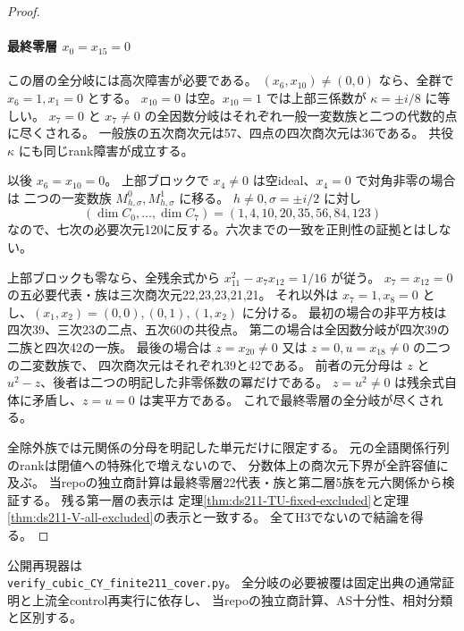 \begin{proof}
\paragraph{最終零層 $x_0=x_{15}=0$}
この層の全分岐には高次障害が必要である。
$(x_6,x_{10})\ne(0,0)$ なら、全群で $x_6=1,x_1=0$ とする。
$x_{10}=0$ は空。$x_{10}=1$ では上部三係数が $\kappa=\pm i/8$ に等しい。
$x_7=0$ と $x_7\ne0$ の全因数分岐はそれぞれ一般一変数族と二つの代数的点に尽くされる。
一般族の五次商次元は57、四点の四次商次元は36である。
共役 $\kappa$ にも同じrank障害が成立する。

以後 $x_6=x_{10}=0$。
上部ブロックで $x_4\ne0$ は空ideal、$x_4=0$ で対角非零の場合は
二つの一変数族 $M^0_{h,\sigma},M^1_{h,\sigma}$ に移る。
$h\ne0,\sigma=\pm i/2$ に対し
\[
 (\dim C_0,\ldots,\dim C_7)=(1,4,10,20,35,56,84,123)
\]
なので、七次の必要次元120に反する。六次までの一致を正則性の証拠とはしない。

上部ブロックも零なら、全残余式から
$x_{11}^2-x_7x_{12}=1/16$ が従う。
$x_7=x_{12}=0$ の五必要代表・族は三次商次元22,23,23,21,21。
それ以外は $x_7=1,x_8=0$ とし、$(x_1,x_2)=(0,0),(0,1),(1,x_2)$ に分ける。
最初の場合の非平方枝は四次39、三次23の二点、五次60の共役点。
第二の場合は全因数分岐が四次39の二族と四次42の一族。
最後の場合は $z=x_{20}\ne0$ 又は $z=0,u=x_{18}\ne0$ の二つの二変数族で、
四次商次元はそれぞれ39と42である。
前者の元分母は $z$ と $u^2-z$、後者は二つの明記した非零係数の冪だけである。
$z=u^2\ne0$ は残余式自体に矛盾し、$z=u=0$ は実平方である。
これで最終零層の全分岐が尽くされる。

全除外族では元関係の分母を明記した単元だけに限定する。
元の全語関係行列のrankは閉値への特殊化で増えないので、
分数体上の商次元下界が全許容値に及ぶ。
当repoの独立商計算は最終零層22代表・族と第二層5族を元六関係から検証する。
残る第一層の表示は
定理\ref{thm:ds211-TU-fixed-excluded}と定理\ref{thm:ds211-V-all-excluded}の表示と一致する。
全てH3でないので結論を得る。
\end{proof}

公開再現器は\\
\texttt{verify\_cubic\_CY\_finite211\_cover.py}。
全分岐の必要被覆は固定出典の通常証明と上流全control再実行に依存し、
当repoの独立商計算、AS十分性、相対分類と区別する。
